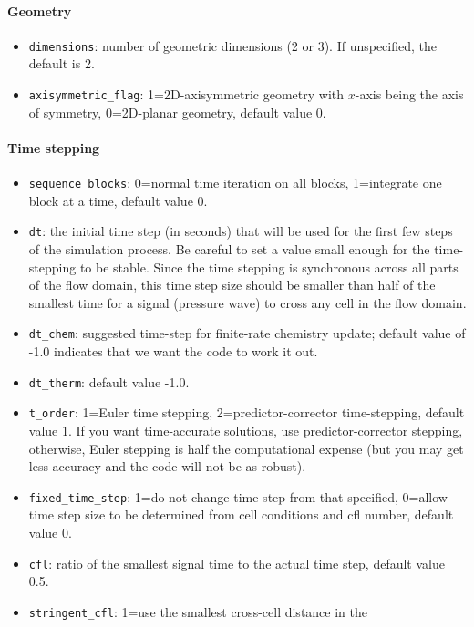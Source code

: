 \documentclass[12pt,a4paper,twoside]{article}
\begin{document}
\paragraph{Geometry}
\begin{itemize}
\item \texttt{dimensions}: number of geometric dimensions (2 or 3).  
  If unspecified, the default is 2.
\item \texttt{axisymmetric\_flag}: 1=2D-axisymmetric geometry with $x$-axis being the axis of symmetry,
  0=2D-planar geometry, default value 0.
\end{itemize}

\paragraph{Time stepping}
\begin{itemize}
\item \texttt{sequence\_blocks}: 0=normal time iteration on all blocks, 1=integrate one block
  at a time, default value 0.
\item \texttt{dt}\ddag: the initial time step (in seconds) that will be used for the
  first few steps of the simulation process.
  Be careful to set a value small enough for the time-stepping to be stable.
  Since the time stepping is synchronous across all parts of the flow domain,
  this time step size should be smaller than half of the smallest time for a signal
  (pressure wave) to cross any cell in the flow domain. 
\item \texttt{dt\_chem}: suggested time-step for finite-rate chemistry update;
  default value of -1.0 indicates that we want the code to work it out.
\item \texttt{dt\_therm}: default value -1.0.
\item \texttt{t\_order}\ddag: 1=Euler time stepping, 2=predictor-corrector
  time-stepping, default value 1.
  If you want time-accurate solutions, use predictor-corrector stepping,
  otherwise, Euler stepping is half the computational expense 
  (but you may get less accuracy and the code will not be as robust).
\item \texttt{fixed\_time\_step}\ddag: 1=do not change time step from that specified, 
  0=allow time step size to be determined from cell conditions and cfl number, default value 0.
\item \texttt{cfl}\ddag: ratio of the smallest signal time to the actual time step,
  default value 0.5.
\item \texttt{stringent\_cfl}\ddag: 1=use the smallest cross-cell distance in the

\end{itemize}
\end{document}
